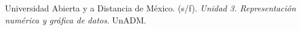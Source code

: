 \documentclass[12pt]{article}
\begin{document}
\newpage
\begin{thebibliography}{X}
	 Universidad Abierta y a Distancia de México. (s/f). \textit{Unidad 3. Representación numérica y gráfica de datos}. UnADM.
 
\end{thebibliography}
\end{document}
